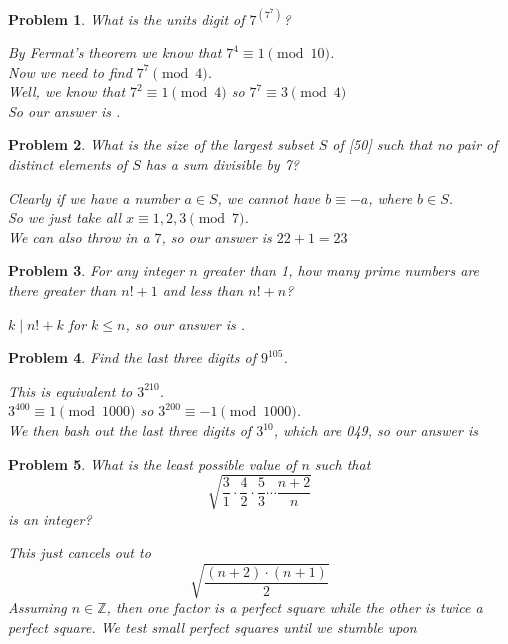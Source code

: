 \documentclass{scrartcl}
\newtheorem{a_problem}{Problem}
\begin{document}
\begin{a_problem}
	What is the units digit of $7^{\left(7^7\right)}$?
	\begin{soln}
		By Fermat's theorem we know that $7^4 \equiv 1 \pmod{10}$. \\
		Now we need to find $7^7 \pmod{4}$. \\
		Well, we know that $7^2 \equiv 1 \pmod 4$ so $7^7 \equiv 3 \pmod4$ \\
		So our answer is .
	\end{soln}
\end{a_problem}

\begin{a_problem}
	What is the size of the largest subset $S$ of [50] such that no pair of distinct elements of $S$ has a sum divisible by 7?
	\begin{soln}
	Clearly if we have a number $a \in S$, we cannot have $b \equiv -a$, where $b \in S$. \\
	So we just take all $x \equiv 1,2,3 \pmod7$. \\
	We can also throw in a $7$, so our answer is $22 + 1 = \boxed{23}$
	\end{soln}
\end{a_problem}

\setcounter{a_problem}{380}
\begin{a_problem}
	For any integer $n$ greater than 1, how many prime numbers are there greater than $n! + 1$ and less than $n! + n$?
	\begin{soln}
		$k \mid n! + k$ for $k \leq n$, so our answer is \boxed{0}.
	\end{soln}
\end{a_problem}
\begin{a_problem}
	Find the last three digits of $9^{105}$.
	\begin{soln}
		This is equivalent to $3^{210}$. \\
		$3^{400} \equiv 1 \pmod{1000}$ so $3^{200} \equiv -1 \pmod{1000}$. \\
		We then bash out the last three digits of $3^{10}$, which are 049, so our answer is \boxed{951}
		
	\end{soln}
\end{a_problem}

\begin{a_problem}
	What is the least possible value of $n$ such that
	\[\sqrt{\frac31 \cdot \frac42 \cdot \frac53 \cdots \frac{n+2}n}\]
	is an integer?
	\begin{soln}
		This just cancels out to
		\[\sqrt{\frac{(n+2) \cdot (n+1)}{2}}\]
		Assuming $n \in \mathbb{Z}$, then one factor is a perfect square while the other is twice a perfect square. We test small perfect squares until we stumble upon \boxed{n=7}
	\end{soln}
\end{a_problem}
\end{document}

